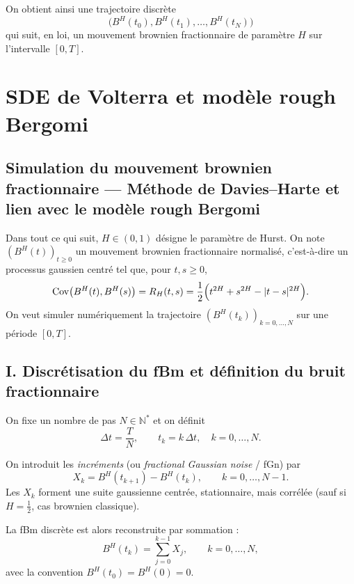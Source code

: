 \documentclass[11pt,a4paper]{article}
\newcommand{\Cov}{\mathrm{Cov}}
\newcommand{\1}{\mathbf{1}}
\newcommand{\bH}{B^{H}}
\begin{document}
On obtient ainsi une trajectoire discrète
\[
  \bigl(\bH(t_0),\bH(t_1),\dots,\bH(t_N)\bigr)
\]
qui suit, en loi, un mouvement brownien fractionnaire de paramètre $H$
sur l'intervalle $[0,T]$.



\section{SDE de Volterra et mod\`ele rough Bergomi}
\label{sec:deriv-rbergomi}



\subsection*{Simulation du mouvement brownien fractionnaire --- Méthode de Davies--Harte et lien avec le modèle rough Bergomi}

Dans tout ce qui suit, $H\in(0,1)$ désigne le paramètre de Hurst.
On note $(\bH(t))_{t\ge 0}$ un mouvement brownien fractionnaire
normalisé, c'est-à-dire un processus gaussien centré tel que, pour
$t,s\ge 0$,
\begin{equation}
  \label{eq:cov-fBm}
  \Cov\bigl(\bH(t),\bH(s)\bigr)
  = R_H(t,s)
  = \frac{1}{2}\Bigl(t^{2H} + s^{2H} - |t-s|^{2H}\Bigr).
\end{equation}
On veut simuler numériquement la trajectoire
$(\bH(t_k))_{k=0,\dots,N}$ sur une période $[0,T]$.

\subsection*{I. Discrétisation du fBm et définition du bruit fractionnaire}

On fixe un nombre de pas $N\in\mathbb{N}^\ast$ et on définit
\begin{equation}
  \Delta t = \frac{T}{N},
  \qquad
  t_k = k\,\Delta t,\quad k=0,\dots,N.
\end{equation}

On introduit les \emph{incréments} (ou \emph{fractional Gaussian
noise} / fGn) par
\begin{equation}
  X_k = \bH(t_{k+1}) - \bH(t_k),
  \qquad k = 0,\dots,N-1.
\end{equation}
Les $X_k$ forment une suite gaussienne centrée, stationnaire, mais
corrélée (sauf si $H=\tfrac12$, cas brownien classique).

La fBm discrète est alors reconstruite par sommation :
\begin{equation}
  \bH(t_k)
  = \sum_{j=0}^{k-1} X_j,
  \qquad k=0,\dots,N,
\end{equation}
avec la convention $\bH(t_0)=\bH(0)=0$.
\end{document}
